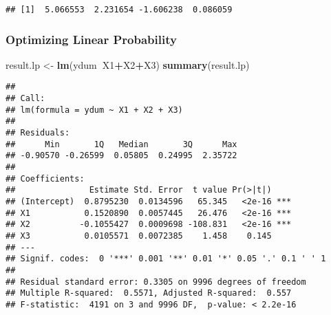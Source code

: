 \documentclass[]{article}
\newenvironment{Shaded}{\begin{snugshade}}{\end{snugshade}}
\newcommand{\KeywordTok}[1]{\textcolor[rgb]{0.13,0.29,0.53}{\textbf{#1}}}
\newcommand{\DataTypeTok}[1]{\textcolor[rgb]{0.13,0.29,0.53}{#1}}
\newcommand{\DecValTok}[1]{\textcolor[rgb]{0.00,0.00,0.81}{#1}}
\newcommand{\StringTok}[1]{\textcolor[rgb]{0.31,0.60,0.02}{#1}}
\newcommand{\ControlFlowTok}[1]{\textcolor[rgb]{0.13,0.29,0.53}{\textbf{#1}}}
\newcommand{\OperatorTok}[1]{\textcolor[rgb]{0.81,0.36,0.00}{\textbf{#1}}}
\newcommand{\NormalTok}[1]{#1}
\begin{document}
\begin{Shaded}
\end{Shaded}

\begin{verbatim}
## [1]  5.066553  2.231654 -1.606238  0.086059
\end{verbatim}

\subsubsection{Optimizing Linear
Probability}\label{optimizing-linear-probability}

\begin{Shaded}
\begin{Highlighting}[]
\NormalTok{result.lp <-}\StringTok{ }\KeywordTok{lm}\NormalTok{(ydum}\OperatorTok{~}\NormalTok{X1}\OperatorTok{+}\NormalTok{X2}\OperatorTok{+}\NormalTok{X3)}
\KeywordTok{summary}\NormalTok{(result.lp)}
\end{Highlighting}
\end{Shaded}

\begin{verbatim}
## 
## Call:
## lm(formula = ydum ~ X1 + X2 + X3)
## 
## Residuals:
##      Min       1Q   Median       3Q      Max 
## -0.90570 -0.26599  0.05805  0.24995  2.35722 
## 
## Coefficients:
##               Estimate Std. Error  t value Pr(>|t|)    
## (Intercept)  0.8795230  0.0134596   65.345   <2e-16 ***
## X1           0.1520890  0.0057445   26.476   <2e-16 ***
## X2          -0.1055427  0.0009698 -108.831   <2e-16 ***
## X3           0.0105571  0.0072385    1.458    0.145    
## ---
## Signif. codes:  0 '***' 0.001 '**' 0.01 '*' 0.05 '.' 0.1 ' ' 1
## 
## Residual standard error: 0.3305 on 9996 degrees of freedom
## Multiple R-squared:  0.5571, Adjusted R-squared:  0.557 
## F-statistic:  4191 on 3 and 9996 DF,  p-value: < 2.2e-16
\end{verbatim}
\end{document}
